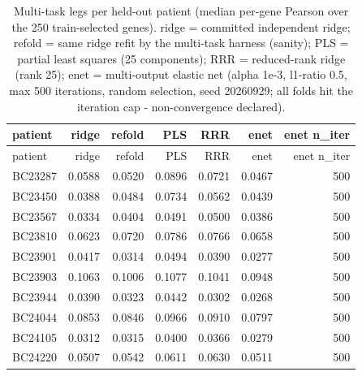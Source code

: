 \begin{longtable}{lrrrrrr}
\caption{Multi-task legs per held-out patient (median per-gene Pearson over the 250 train-selected genes). ridge = committed independent ridge; refold = same ridge refit by the multi-task harness (sanity); PLS = partial least squares (25 components); RRR = reduced-rank ridge (rank 25); enet = multi-output elastic net (alpha 1e-3, l1-ratio 0.5, max 500 iterations, random selection, seed 20260929; all folds hit the iteration cap - non-convergence declared).}\label{tab:multitask}\\
\toprule
patient & ridge & refold & PLS & RRR & enet & enet n\_iter \\
\midrule
\endfirsthead
\toprule
patient & ridge & refold & PLS & RRR & enet & enet n\_iter \\
\midrule
\endhead
BC23287 & 0.0588 & 0.0520 & 0.0896 & 0.0721 & 0.0467 & 500 \\
BC23450 & 0.0388 & 0.0484 & 0.0734 & 0.0562 & 0.0439 & 500 \\
BC23567 & 0.0334 & 0.0404 & 0.0491 & 0.0500 & 0.0386 & 500 \\
BC23810 & 0.0623 & 0.0720 & 0.0786 & 0.0766 & 0.0658 & 500 \\
BC23901 & 0.0417 & 0.0314 & 0.0494 & 0.0390 & 0.0277 & 500 \\
BC23903 & 0.1063 & 0.1006 & 0.1077 & 0.1041 & 0.0948 & 500 \\
BC23944 & 0.0390 & 0.0323 & 0.0442 & 0.0302 & 0.0268 & 500 \\
BC24044 & 0.0853 & 0.0846 & 0.0966 & 0.0910 & 0.0797 & 500 \\
BC24105 & 0.0312 & 0.0315 & 0.0400 & 0.0366 & 0.0279 & 500 \\
BC24220 & 0.0507 & 0.0542 & 0.0611 & 0.0630 & 0.0511 & 500 \\
\bottomrule
\end{longtable}
